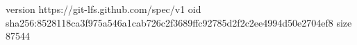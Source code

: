 version https://git-lfs.github.com/spec/v1
oid sha256:8528118ca3f975a546a1cab726c2f3689ffc92785d2f2c2ee4994d50e2704ef8
size 87544
